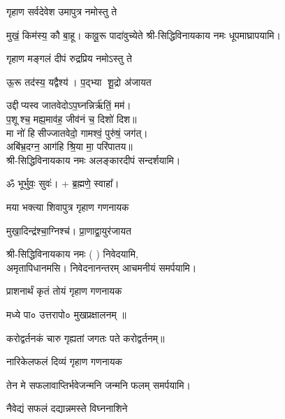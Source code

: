 \begin{center}
\begingroup
\setlength{\columnseprule}{1pt}
\let\chapt\sect


\endgroup

{गृहाण सर्वदेवेश उमापुत्र नमोस्तु ते} 

{मुखं॒ किम॑स्य॒ कौ बा॒हू। कावू॒रू पादा॑वुच्येते}
श्री-सिद्धिविनायकाय नमः धूपमाघ्रापयामि।\medskip

{गृहाण मङ्गलं दीपं रुद्रप्रिय नमोऽस्तु ते}

{ऊ॒रू तद॑स्य॒ यद्वैश्य॑। प॒द्भ्या शू॒द्रो अ॑जायत}

उद्दीप्यस्व जातवेदोऽप॒घ्नन्निर्ऋ॑तिं॒ मम॑।\\
प॒शूश्च॒ मह्य॒माव॑ह॒ जीव॑नं च॒ दिशो॑ दिश॥ \\
मा नो॑ हिसीज्जातवेदो॒ गामश्वं॒ पुरु॑षं॒ जग॑त्।\\
अबि॑भ्र॒दग्न॒ आग॑हि श्रि॒या मा॒ परि॑पातय॥ \\

श्री-सिद्धिविनायकाय नमः अलङ्कारदीपं सन्दर्शयामि।\medskip

ॐ भूर्भुवः॒ सुवः॑। + ब्र॒ह्मणे॒ स्वाहा᳚।

{मया भक्त्या शिवापुत्र गृहाण गणनायक}

{मुखा॒दिन्द्र॑श्चा॒ग्निश्च॑। प्रा॒णाद्वा॒युर॑जायत}

श्री-सिद्धिविनायकाय नमः (	) निवेदयामि, \\
अमृतापिधानमसि। निवेदनानन्तरम् आचमनीयं समर्पयामि।\medskip

{प्राशनार्थं कृतं तोयं गृहाण गणनायक}

मध्ये पा०  उत्तरापो० मुखप्रक्षालनम् ॥

{करोद्वर्तनकं चारु गृह्यतां जगतः पते} 
करोद्वर्तनम्॥

{नारिकेलफलं दिव्यं गृहाण गणनायक} 

{तेन मे सफलावाप्तिर्भवेजन्मनि जन्मनि}
फलम् समर्पयामि।\medskip
  
{नैवेद्यं सफलं दद्यान्नमस्ते विघ्ननाशिने} 
   

\end{center}
